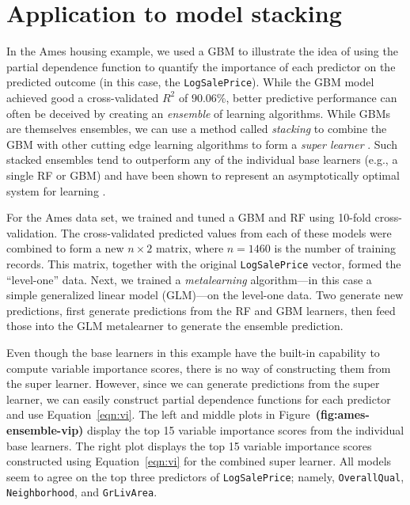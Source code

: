 \documentclass[12pt]{article}
\def\code#1{\texttt{#1}}
\def\ref#1{\textbf{(#1)}}
\begin{document}
\section{Application to model stacking}
\label{sec:ensemble}

In the Ames housing example, we used a GBM to illustrate the idea of using the partial dependence function to quantify the importance of each predictor on the predicted outcome (in this case, the \code{LogSalePrice}). While the GBM model achieved good a cross-validated $R^2$ of $90.06$\%, better predictive performance can often be deceived by creating an \textit{ensemble} of learning algorithms. While GBMs are themselves ensembles, we can use a method called \textit{stacking} to combine the GBM with other  cutting edge learning algorithms to form a \textit{super learner} \citep{stacked-wolpert-1992}. Such stacked ensembles tend to outperform any of the individual base learners (e.g., a single RF or GBM) and have been shown to represent an asymptotically optimal system for learning \citep{super-laan-2003}.

For the Ames data set, we trained and tuned a GBM and RF using 10-fold cross-validation. The cross-validated predicted values from each of these models were combined to form a new $n \times 2$ matrix, where $n = 1460$ is the number of training records. This matrix, together with the original \code{LogSalePrice} vector, formed the ``level-one'' data. Next, we trained a \textit{metalearning} algorithm---in this case a simple generalized linear model (GLM)---on the level-one data. Two generate new predictions, first generate predictions from the RF and GBM learners, then feed those into the GLM metalearner to generate the ensemble prediction. 

Even though the base learners in this example have the built-in capability to compute variable importance scores, there is no way of constructing them from the super learner. However, since we can generate predictions from the super learner, we can easily construct partial dependence functions for each predictor and use Equation~\eqref{eqn:vi}. The left and middle plots in Figure~\ref{fig:ames-ensemble-vip} display the top 15 variable importance scores from the individual base learners. The right plot displays the top 15 variable importance scores constructed using Equation~\eqref{eqn:vi} for the combined super learner. All models seem to agree on the top three predictors of \code{LogSalePrice}; namely, \code{OverallQual}, \code{Neighborhood}, and \code{GrLivArea}. 
\end{document}
